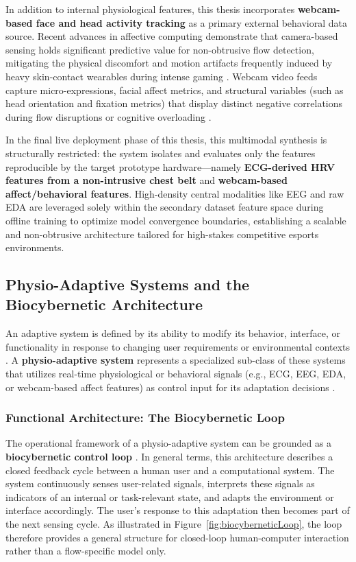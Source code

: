 In addition to internal physiological features, this thesis incorporates \textbf{webcam-based face and head activity tracking} as a primary external behavioral data source. Recent advances in affective computing demonstrate that camera-based sensing holds significant predictive value for non-obtrusive flow detection, mitigating the physical discomfort and motion artifacts frequently induced by heavy skin-contact wearables during intense gaming \autocite{uechtritz2026neurophysiological}. Webcam video feeds capture micro-expressions, facial affect metrics, and structural variables (such as head orientation and fixation metrics) that display distinct negative correlations during flow disruptions or cognitive overloading \autocite{kutt2022biraffe2}.

In the final live deployment phase of this thesis, this multimodal synthesis is structurally restricted: the system isolates and evaluates only the features reproducible by the target prototype hardware—namely \textbf{ECG-derived HRV features from a non-intrusive chest belt } and \textbf{webcam-based affect/behavioral features}. High-density central modalities like EEG and raw EDA are leveraged solely within the secondary dataset feature space during offline training to optimize model convergence boundaries, establishing a scalable and non-obtrusive architecture tailored for high-stakes competitive esports environments.

\subsection{Physio-Adaptive Systems and the Biocybernetic Architecture}
An adaptive system is defined by its ability to modify its behavior, interface, or functionality in response to changing user requirements or environmental contexts \autocite{oppermann1994adaptivity}. A \textbf{physio-adaptive system} represents a specialized sub-class of these systems that utilizes real-time physiological or behavioral signals (e.g., ECG, EEG, EDA, or webcam-based affect features) as control input for its adaptation decisions \autocite{fairclough2009fundamentals}.

\subsubsection{Functional Architecture: The Biocybernetic Loop}
The operational framework of a physio-adaptive system can be grounded as a \textbf{biocybernetic control loop} \autocite{pope1995biocybernetic}. In general terms, this architecture describes a closed feedback cycle between a human user and a computational system. The system continuously senses user-related signals, interprets these signals as indicators of an internal or task-relevant state, and adapts the environment or interface accordingly. The user's response to this adaptation then becomes part of the next sensing cycle. As illustrated in Figure~\ref{fig:biocyberneticLoop}, the loop therefore provides a general structure for closed-loop human-computer interaction rather than a flow-specific model only.

